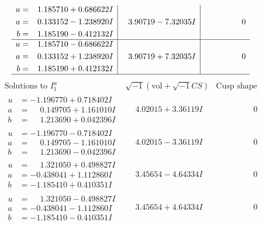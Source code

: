\documentclass[1p]{elsarticle_modified}
\theoremstyle{definition}
\newcommand{\I}{\sqrt{-1}}
\begin{document}
$$\begin{array}{c|c|c}
\begin{aligned}
u &= \phantom{-}1.185710 + 0.686622 I \\
a &= \phantom{-}0.133152 - 1.238920 I \\
b &= \phantom{-}1.185190 - 0.412132 I\end{aligned}
 & \phantom{-}3.90719 - 7.32035 I & \phantom{-0.000000 } 0 \\ \hline\begin{aligned}
u &= \phantom{-}1.185710 - 0.686622 I \\
a &= \phantom{-}0.133152 + 1.238920 I \\
b &= \phantom{-}1.185190 + 0.412132 I\end{aligned}
 & \phantom{-}3.90719 + 7.32035 I & \phantom{-0.000000 } 0\\
 \hline 
 \end{array}$$\newpage$$\begin{array}{c|c|c}  
\text{Solutions to }I^u_{1}& \I (\text{vol} + \sqrt{-1}CS) & \text{Cusp shape}\\
 \hline 
\begin{aligned}
u &= -1.196770 + 0.718402 I \\
a &= \phantom{-}0.149705 + 1.161010 I \\
b &= \phantom{-}1.213690 + 0.042396 I\end{aligned}
 & \phantom{-}4.02015 + 3.36119 I & \phantom{-0.000000 } 0 \\ \hline\begin{aligned}
u &= -1.196770 - 0.718402 I \\
a &= \phantom{-}0.149705 - 1.161010 I \\
b &= \phantom{-}1.213690 - 0.042396 I\end{aligned}
 & \phantom{-}4.02015 - 3.36119 I & \phantom{-0.000000 } 0 \\ \hline\begin{aligned}
u &= \phantom{-}1.321050 + 0.498827 I \\
a &= -0.438041 + 1.112860 I \\
b &= -1.185410 + 0.410351 I\end{aligned}
 & \phantom{-}3.45654 - 4.64334 I & \phantom{-0.000000 } 0 \\ \hline\begin{aligned}
u &= \phantom{-}1.321050 - 0.498827 I \\
a &= -0.438041 - 1.112860 I \\
b &= -1.185410 - 0.410351 I\end{aligned}
 & \phantom{-}3.45654 + 4.64334 I & \phantom{-0.000000 } 0 \\ \hline\begin{aligned}

\end{aligned}
\end{array}$$
\end{document}
